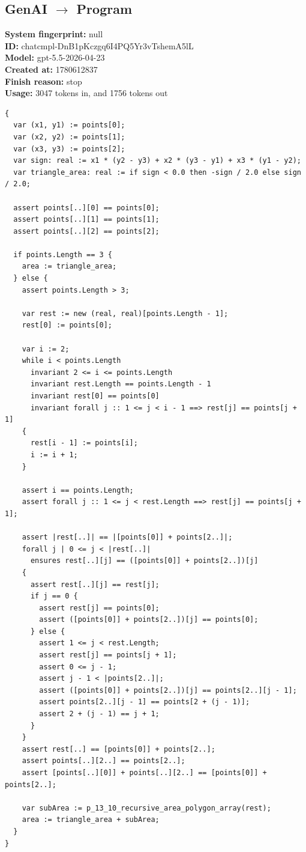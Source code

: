\documentclass{article}
\begin{document}
\subsection*{GenAI $\rightarrow$ Program}
\textbf{System fingerprint: }null
\\\textbf{ID: }chatcmpl-DnB1pKczgq6I4PQ5Yr3vTshemA5lL
\\\textbf{Model: }gpt-5.5-2026-04-23
\\\textbf{Created at: }1780612837
\\\textbf{Finish reason: }stop
\\\textbf{Usage: }3047 tokens in, and 1756 tokens out
\begin{lstlisting}
{
  var (x1, y1) := points[0];
  var (x2, y2) := points[1];
  var (x3, y3) := points[2];
  var sign: real := x1 * (y2 - y3) + x2 * (y3 - y1) + x3 * (y1 - y2);
  var triangle_area: real := if sign < 0.0 then -sign / 2.0 else sign / 2.0;

  assert points[..][0] == points[0];
  assert points[..][1] == points[1];
  assert points[..][2] == points[2];

  if points.Length == 3 {
    area := triangle_area;
  } else {
    assert points.Length > 3;

    var rest := new (real, real)[points.Length - 1];
    rest[0] := points[0];

    var i := 2;
    while i < points.Length
      invariant 2 <= i <= points.Length
      invariant rest.Length == points.Length - 1
      invariant rest[0] == points[0]
      invariant forall j :: 1 <= j < i - 1 ==> rest[j] == points[j + 1]
    {
      rest[i - 1] := points[i];
      i := i + 1;
    }

    assert i == points.Length;
    assert forall j :: 1 <= j < rest.Length ==> rest[j] == points[j + 1];

    assert |rest[..]| == |[points[0]] + points[2..]|;
    forall j | 0 <= j < |rest[..]|
      ensures rest[..][j] == ([points[0]] + points[2..])[j]
    {
      assert rest[..][j] == rest[j];
      if j == 0 {
        assert rest[j] == points[0];
        assert ([points[0]] + points[2..])[j] == points[0];
      } else {
        assert 1 <= j < rest.Length;
        assert rest[j] == points[j + 1];
        assert 0 <= j - 1;
        assert j - 1 < |points[2..]|;
        assert ([points[0]] + points[2..])[j] == points[2..][j - 1];
        assert points[2..][j - 1] == points[2 + (j - 1)];
        assert 2 + (j - 1) == j + 1;
      }
    }
    assert rest[..] == [points[0]] + points[2..];
    assert points[..][2..] == points[2..];
    assert [points[..][0]] + points[..][2..] == [points[0]] + points[2..];

    var subArea := p_13_10_recursive_area_polygon_array(rest);
    area := triangle_area + subArea;
  }
}
\end{lstlisting}
\end{document}
